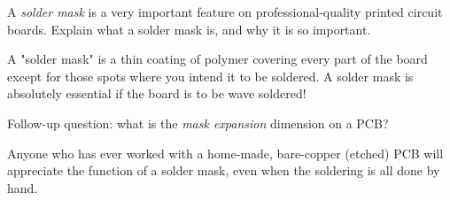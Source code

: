 

A {\it solder mask} is a very important feature on professional-quality printed circuit boards.  Explain what a solder mask is, and why it is so important.







A "solder mask" is a thin coating of polymer covering every part of the board except for those spots where you intend it to be soldered.  A solder mask is absolutely essential if the board is to be wave soldered!

\vskip 10pt

Follow-up question: what is the {\it mask expansion} dimension on a PCB?







Anyone who has ever worked with a home-made, bare-copper (etched) PCB will appreciate the function of a solder mask, even when the soldering is all done by hand.




